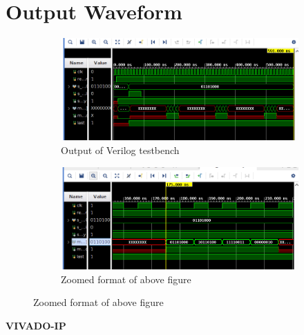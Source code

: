 \documentclass{article}
\begin{document}
\section{Output Waveform}
\vspace{1cm}
\begin{figure}[h]
\centering
\begin{subfigure}[b]{0.8\textwidth}
    \centering
\includegraphics[width=\textwidth]{figs/p2rtlwavfull.png}
    \caption{Output of Verilog testbench}
    \label{fig:my_label}
\end{subfigure}
\hfill
\begin{subfigure}[b]{0.8\textwidth}
    \centering
\includegraphics[width=\textwidth]{figs/p2rtlwav.png}
    \caption{Zoomed format of above figure}
    \label{fig:my_label}
\end{subfigure}
\end{figure}

\vspace{20cm}


\maketitle
\hfill \textbf{VIVADO-IP}
\end{document}
